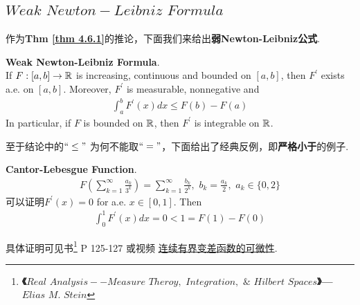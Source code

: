 \newpage
\subsection{$Weak \,\, Newton-Leibniz \,\, Formula$}
	作为\textbf{Thm \ref{thm 4.6.1}}的推论，下面我们来给出\textbf{弱Newton-Leibniz公式}.
	\begin{corollary}\label{cor 4.6.2}
		\textbf{Weak Newton-Leibniz Formula}. \\
		If $F : [a , b] \rightarrow \mathbb{R}$ is increasing, continuous and bounded on $[a , b]$, then $F^{'}$ exists a.e. on $[a , b]$. Moreover, $F^{'}$ is measurable, nonnegative and
		\begin{align}
			\int_{a}^{b}{F^{'}(x) dx} \leq F(b) - F(a)
		\end{align}
		In particular, if $F$ is bounded on $\mathbb{R}$, then $F^{'}$ is integrable on $\mathbb{R}$.
		
		\vspace{4em}
		\begin{rmk}
			至于结论中的$``\leq"$ 为何不能取$``="$，下面给出了经典反例，即\textbf{严格小于}的例子.
			\begin{example}\label{ex 4.6.1}
				\textbf{Cantor-Lebesgue Function}. 
				\begin{align}
					F\left( \sum_{k = 1}^{\infty}{\frac{a_k}{3^k}} \right) 
					= \sum_{k = 1}^{\infty}{\frac{b_k}{2^k}} , \,\, b_k = \frac{a_k}{2} , \,\, a_k \in \{ 0 , 2 \}
				\end{align}
				可以证明$F^{'}(x) = 0$ for a.e. $x \in [0 , 1]$. Then
				\begin{align}
					\int_{0}^{1}{F^{'}(x) dx} = 0 < 1 = F(1) - F(0)
				\end{align}
				\begin{center}
					具体证明可见书\footnote{\textbf{《$Real \,\, Analysis -- Measure \,\, Theroy, \,\, Integration, \,\, \& \,\, Hilbert \,\, Spaces$》--- $Elias \,\, M. \,\, Stein$}} P 125-127 或视频 \href{https://www.bilibili.com/video/BV1FT411C7wM/?p=38}{连续有界变差函数的可微性}.
				\end{center}
			\end{example}
		\end{rmk}	
		

\end{corollary}

